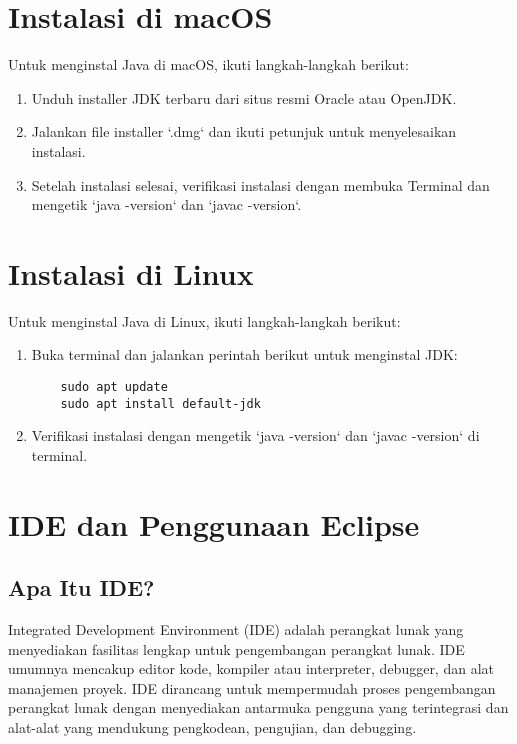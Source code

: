 \section{Instalasi di macOS}

Untuk menginstal Java di macOS, ikuti langkah-langkah berikut:

\begin{enumerate}
\item Unduh installer JDK terbaru dari situs resmi Oracle atau OpenJDK.
\item Jalankan file installer `.dmg` dan ikuti petunjuk untuk menyelesaikan instalasi.
\item Setelah instalasi selesai, verifikasi instalasi dengan membuka Terminal dan mengetik `java -version` dan `javac -version`.
\end{enumerate}

\section{Instalasi di Linux}

Untuk menginstal Java di Linux, ikuti langkah-langkah berikut:

\begin{enumerate}
\item Buka terminal dan jalankan perintah berikut untuk menginstal JDK:
\begin{verbatim}
	sudo apt update
	sudo apt install default-jdk
\end{verbatim}
\item Verifikasi instalasi dengan mengetik `java -version` dan `javac -version` di terminal.
\end{enumerate}

\section{IDE dan Penggunaan Eclipse}

\subsection{Apa Itu IDE?}

Integrated Development Environment (IDE) adalah perangkat lunak yang menyediakan fasilitas lengkap untuk pengembangan perangkat lunak. IDE umumnya mencakup editor kode, kompiler atau interpreter, debugger, dan alat manajemen proyek. IDE dirancang untuk mempermudah proses pengembangan perangkat lunak dengan menyediakan antarmuka pengguna yang terintegrasi dan alat-alat yang mendukung pengkodean, pengujian, dan debugging.

